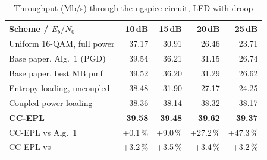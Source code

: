 \begin{table}[t]\centering\footnotesize
\caption{Throughput (Mb/s) through the ngspice circuit, LED with droop}\label{tab:spice}
\begin{tabular}{@{}lrrrr@{}}\toprule
Scheme \;/\; $E_b/N_0$ & 10\,dB & 15\,dB & 20\,dB & 25\,dB \\\midrule
Uniform 16-QAM, full power & 37.17 & 30.91 & 26.46 & 23.71 \\
Base paper, Alg.~1 (PGD) & 39.54 & 36.21 & 31.15 & 26.74 \\
Base paper, best MB pmf & 39.52 & 36.20 & 31.29 & 26.62 \\
Entropy loading, uncoupled & 38.48 & 31.90 & 27.17 & 24.25 \\
Coupled power loading~\cite{ling2020} & 38.36 & 38.14 & 38.32 & 38.17 \\
\textbf{CC-EPL} & \textbf{39.58} & \textbf{39.48} & \textbf{39.62} & \textbf{39.37} \\
\midrule CC-EPL vs Alg.~1 & +0.1\,\% & +9.0\,\% & +27.2\,\% & +47.3\,\% \\
CC-EPL vs~\cite{ling2020} & +3.2\,\% & +3.5\,\% & +3.4\,\% & +3.2\,\% \\
\bottomrule\end{tabular}\end{table}

